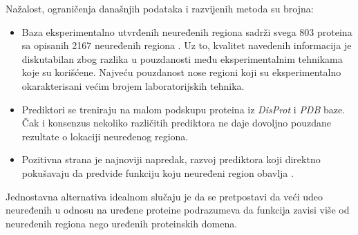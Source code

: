 Nažalost, ograničenja današnjih podataka i razvijenih metoda su brojna:
\begin{itemize}
  \item
    Baza eksperimentalno utvrđenih neuređenih regiona
    \textit{} sadrži svega 803 proteina sa opisanih 2167
    neuređenih regiona \parencite{Piovesan2016}.  Uz to, kvalitet navedenih
    informacija je diskutabilan zbog razlika u pouzdanosti među
    eksperimentalnim tehnikama koje su korišćene.  Najveću pouzdanost nose
    regioni koji su eksperimentalno okarakterisani većim brojem
    laboratorijskih tehnika.

  \item
    Prediktori se treniraju na malom podskupu proteina iz \textit{DisProt}
    i \textit{PDB}  baze. Čak i konsenzus nekoliko različitih prediktora ne daje
    dovoljno pouzdane rezultate o lokaciji neuređenog regiona.

  \item 
    Pozitivna strana je najnoviji napredak, razvoj prediktora koji direktno
    pokušavaju da predvide funkciju koju neuređeni region obavlja \parencite{Meng_c2017}.

\end{itemize}

Jednostavna alternativa idealnom slučaju je da se pretpostavi da veći udeo neuređenih u odnosu
na uređene proteine podrazumeva da funkcija zavisi više od neuređenih regiona nego uređenih proteinskih domena. 

